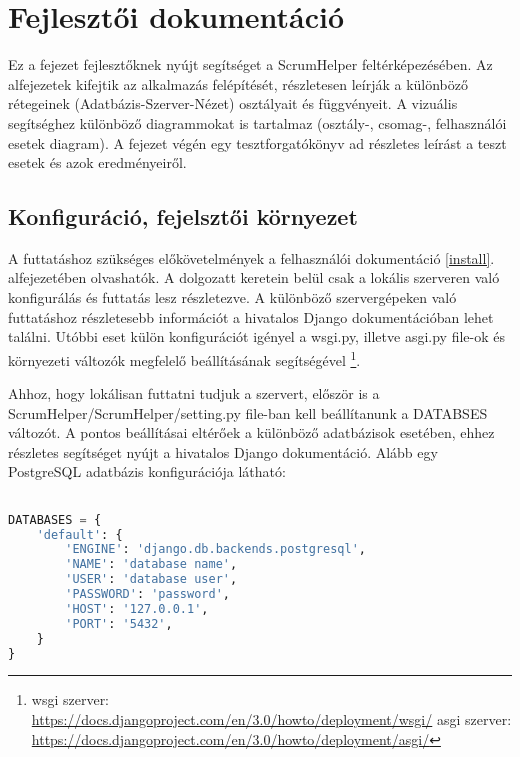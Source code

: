 \chapter{Fejlesztői dokumentáció} %
\label{ch:impl}

Ez a fejezet fejlesztőknek nyújt segítséget a ScrumHelper feltérképezésében. Az alfejezetek kifejtik az alkalmazás felépítését, részletesen leírják a különböző rétegeinek (Adatbázis-Szerver-Nézet) osztályait és függvényeit. A vizuális segítséghez különböző diagrammokat is tartalmaz (osztály-, csomag-, felhasználói esetek diagram). A fejezet végén egy tesztforgatókönyv ad részletes leírást a teszt esetek és azok eredményeiről.

\section{Konfiguráció, fejelsztői környezet}
\label{config}

A futtatáshoz szükséges előkövetelmények a felhasználói dokumentáció \ref{install}. alfejezetében olvashatók. A dolgozatt keretein belül csak a lokális szerveren való konfigurálás és futtatás lesz részletezve. A különböző szervergépeken való futtatáshoz részletesebb információt a hivatalos Django dokumentációban lehet találni. Utóbbi eset külön konfigurációt igényel a wsgi.py, illetve asgi.py file-ok és környezeti változók megfelelő beállításának segítségével \footnote{wsgi szerver: \url{https://docs.djangoproject.com/en/3.0/howto/deployment/wsgi/} asgi szerver: \url{https://docs.djangoproject.com/en/3.0/howto/deployment/asgi/}}.  

Ahhoz, hogy lokálisan futtatni tudjuk a szervert, először is a ScrumHelper/ScrumHelper/setting.py file-ban kell beállítanunk a DATABSES változót. A pontos beállításai eltérőek a különböző adatbázisok esetében, ehhez részletes segítséget nyújt a hivatalos Django dokumentáció. Alább  egy PostgreSQL adatbázis konfigurációja látható:

\begin{lstlisting}[language={python}]

DATABASES = {
    'default': {
        'ENGINE': 'django.db.backends.postgresql',
        'NAME': 'database name',
        'USER': 'database user',
        'PASSWORD': 'password',
        'HOST': '127.0.0.1',
        'PORT': '5432',
    }
}

\end{lstlisting}

